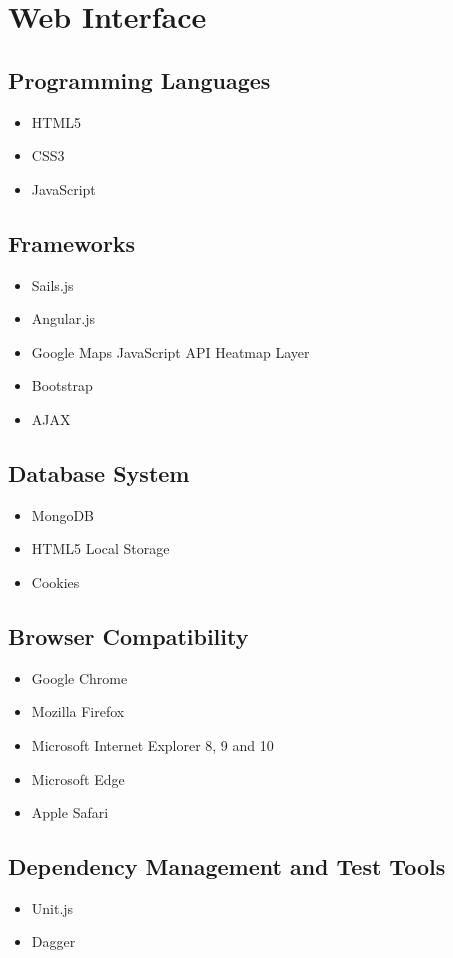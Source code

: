 \documentclass[11pt,fleqn]{book} %
\begin{document}
	\section{Web Interface}
	\subsection{Programming Languages}
	\begin{itemize}
		\item HTML5
		\item CSS3
		\item JavaScript
	\end{itemize}
	\subsection{Frameworks}
	\begin{itemize}
		\item Sails.js
		\item Angular.js
		\item Google Maps JavaScript API Heatmap Layer
		\item Bootstrap
		\item AJAX					
	\end{itemize}
	\subsection{Database System}
	\begin{itemize}
		\item MongoDB
		\item HTML5 Local Storage
		\item Cookies				
	\end{itemize}
	\subsection{Browser Compatibility}
	\begin{itemize}
		\item Google Chrome
		\item Mozilla Firefox
		\item Microsoft Internet Explorer 8, 9 and 10
		\item Microsoft Edge
		\item Apple Safari						
	\end{itemize}
	\subsection{Dependency Management and Test Tools}
	\begin{itemize}
		\item Unit.js
		\item Dagger
	\end{itemize}
\end{document}
